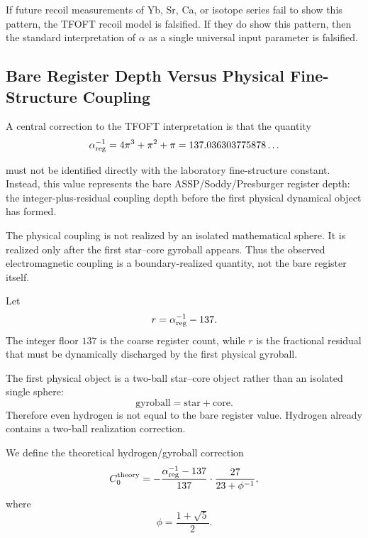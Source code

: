 \documentclass[11pt,a4paper]{article}
\begin{document}
    If future recoil measurements of Yb, Sr, Ca, or isotope series fail to show this pattern, the TFOFT recoil model is falsified. If they do show this pattern, then the standard interpretation of \(\alpha\) as a single universal input parameter is falsified.

  \subsection{Bare Register Depth Versus Physical Fine-Structure Coupling}

    A central correction to the TFOFT interpretation is that the quantity
    \begin{equation}
    \alpha_{\rm reg}^{-1}
    =
    4\pi^3+\pi^2+\pi
    =
    137.036303775878\ldots
    \end{equation}

    must not be identified directly with the laboratory fine-structure constant. Instead, this value represents the bare ASSP/Soddy/Presburger register depth: the integer-plus-residual coupling depth before the first physical dynamical object has formed.
 
    The physical coupling is not realized by an isolated mathematical sphere. It is realized only after the first star--core gyroball appears. Thus the observed electromagnetic coupling is a boundary-realized quantity, not the bare register itself.

    Let
    \begin{equation}
    r = \alpha_{\rm reg}^{-1}-137.
    \end{equation}  
    The integer floor \(137\) is the coarse register count, while \(r\) is the  fractional residual that must be dynamically discharged by the first  physical gyroball.

    The first physical object is a two-ball star--core object rather than an isolated single sphere:
    \begin{equation}
    \mathrm{gyroball}=\mathrm{star}+\mathrm{core}.
    \end{equation} 
    Therefore even hydrogen is not equal to the bare register value. Hydrogen already contains a two-ball realization correction.

    We define the theoretical hydrogen/gyroball correction
    \begin{equation}
    C_0^{\rm theory}
    =
    -
    \frac{\alpha_{\rm reg}^{-1}-137}{137}
    \cdot
    \frac{27}{23+\phi^{-1}},
    \end{equation}
    where
    \begin{equation}
    \phi=\frac{1+\sqrt{5}}{2}.
    \end{equation}
\end{document}

